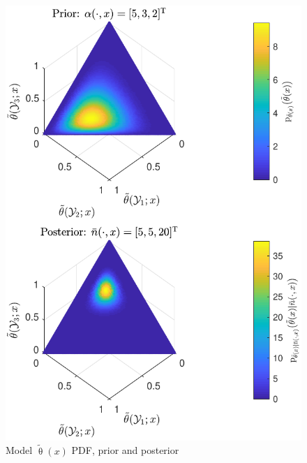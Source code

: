 \documentclass[conference]{IEEEtran}
\begin{document}
\begin{figure}
\centering
\includegraphics[width=0.9\linewidth]{P_theta_post_tilde.pdf}
\caption{Model $\tilde{\uptheta}(x)$ PDF, prior and posterior}
\label{fig:P_theta_D}
\end{figure}
\end{document}
